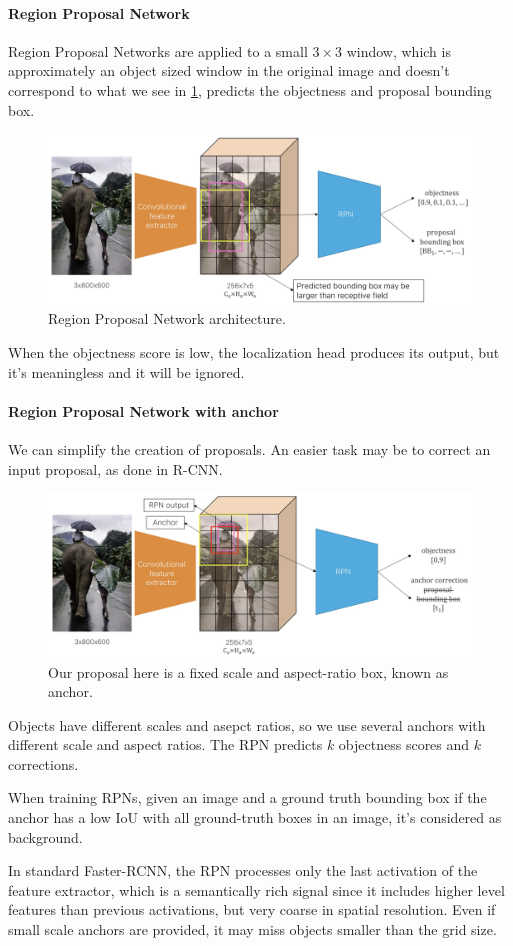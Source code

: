 \paragraph{Region Proposal Network}

Region Proposal Networks are applied to a small $3\times 3$ window, which is approximately an object sized window in the original image and doesn't correspond to what we see in \ref{fig:rpn}, predicts the objectness and proposal bounding box.

\begin{figure}[htbp]
  \centering
  \includegraphics[width=0.6\linewidth]{./img/rpn.jpg}
  \caption{Region Proposal Network architecture.}
  \label{fig:rpn}
\end{figure}

When the objectness score is low, the localization head produces its output, but it's meaningless and it will be ignored.

\paragraph{Region Proposal Network with anchor}
We can simplify the creation of proposals.
An easier task may be to correct an input proposal, as done in R-CNN.

\begin{figure}[htbp]
  \centering
  \includegraphics[width=0.6\linewidth]{./img/rpn_anchor.jpg}
  \caption{Our proposal here is a fixed scale and aspect-ratio box, known as anchor.}
\end{figure}

Objects have different scales and asepct ratios, so we use several anchors with different scale and aspect ratios.
The RPN predicts $k$ objectness scores and $k$ corrections.

When training RPNs, given an image and a ground truth bounding box if the anchor has a low IoU with all ground-truth boxes in an image, it's considered as background.

In standard Faster-RCNN, the RPN processes only the last activation of the feature extractor, which is a semantically rich signal since it includes higher level features than previous activations, but very coarse in spatial resolution.
Even if small scale anchors are provided, it may miss objects smaller than the grid size.

